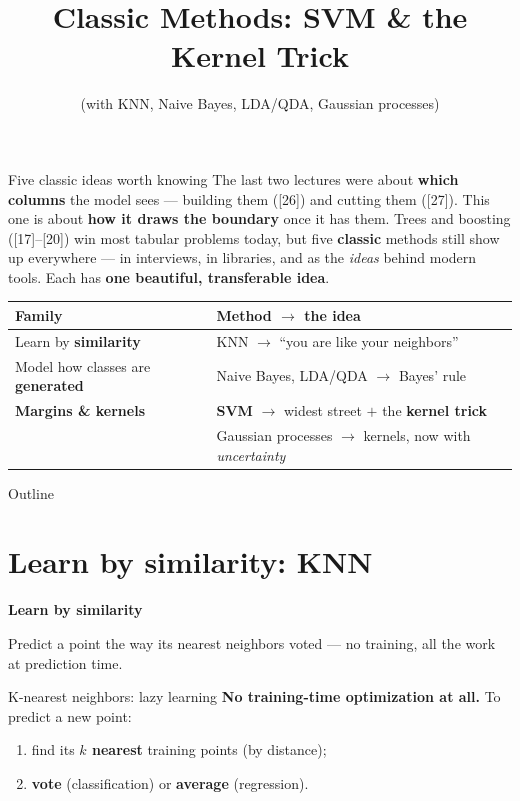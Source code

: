 \documentclass[aspectratio=169]{beamer}
\title{Classic Methods: SVM \& the Kernel Trick}
\subtitle{(with KNN, Naive Bayes, LDA/QDA, Gaussian processes)}
\date{}
\newcommand{\sectiontransition}[2]{%
  \begin{frame}[plain]
    \vfill
    \begin{center}
      {\Large\color{popblue}\textbf{#1}}\\[0.9em]
      \begin{minipage}{0.82\textwidth}\centering\small #2 \end{minipage}
    \end{center}
    \vfill
  \end{frame}}
\begin{document}
\begin{frame}{Five classic ideas worth knowing}
  The last two lectures were about \textbf{which columns} the model sees --- building them
  ([26]) and cutting them ([27]). This one is about \textbf{how it draws the boundary} once it
  has them. Trees and boosting ([17]--[20]) win most tabular problems today, but five
  \textbf{classic} methods still show up everywhere --- in interviews, in libraries, and as the
  \emph{ideas} behind modern tools. Each has \textbf{one beautiful, transferable idea}.
  \vfill
  \begin{center}\small
    \renewcommand{\arraystretch}{1.25}
    \begin{tabular}{l l}
      \textbf{Family} & \textbf{Method $\to$ the idea} \\
      \hline
      Learn by \textbf{similarity} & KNN $\to$ ``you are like your neighbors'' \\
      Model how classes are \textbf{generated} & Naive Bayes, LDA/QDA $\to$ Bayes' rule \\
      \textbf{Margins \& kernels} & \textbf{SVM} $\to$ widest street $+$ the \textbf{kernel trick} \\
      & Gaussian processes $\to$ kernels, now with \emph{uncertainty} \\
      \hline
    \end{tabular}
  \end{center}
  \vfill
\end{frame}

\begin{frame}{Outline}
  \tableofcontents
\end{frame}

\section{Learn by similarity: KNN}
\sectiontransition{Learn by similarity}{Predict a point the way its nearest neighbors voted ---
no training, all the work at prediction time.}

\begin{frame}{K-nearest neighbors: lazy learning}
  \textbf{No training-time optimization at all.} To predict a new point:
  \begin{enumerate}\small
    \item find its \textbf{$k$ nearest} training points (by distance);
    \item \textbf{vote} (classification) or \textbf{average} (regression).
  \end{enumerate}
  \vfill
\end{frame}
\end{document}
